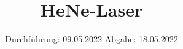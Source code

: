

\subject{V61}
\title{HeNe-Laser}
\date{%
  Durchführung: 09.05.2022
  \hspace{3em}
  Abgabe: 18.05.2022
}



\maketitle
\thispagestyle{empty}
\tableofcontents
\newpage






\printbibliography{}


